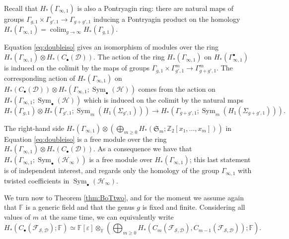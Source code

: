 \documentclass{amsart}
\theoremstyle{plain}
\theoremstyle{definition}
\newcommand{\D}{\mathcal{D}}
\newcommand{\F}{\mathbb{F}}
\newcommand{\cF}{\mathcal{F}}
\renewcommand{\H}{\mathcal{H}}
\renewcommand{\S}{\mathcal{S}}
\newcommand{\Z}{\mathbb{Z}}
\renewcommand{\gg}{\Gamma_{g,1}}
\newcommand{\pa}[1]{\left(#1\right)}
\renewcommand{\epsilon}{\varepsilon}
\DeclareMathOperator{\Sym}{Sym}
\def\colim{\mathop{\mathrm{colim}}\nolimits}
\begin{document}
Recall that $H_*\pa{\Gamma_{\infty,1}}$ is also a Pontryagin ring: there are natural maps of groups
$\Gamma_{g,1}\times\Gamma_{g',1}\to\Gamma_{g+g',1}$ inducing a Pontryagin product on the homology 
$H_*\pa{\Gamma_{\infty,1}}=\colim_{g\to\infty} H_*\pa{\gg}$.

Equation \ref{eq:doubleiso} gives
an isomorphism of modules over the ring
$H_*\pa{\Gamma_{\infty,1}}\otimes H_*(C_{\bullet}(\D))$. The action of the ring $H_*\pa{\Gamma_{\infty,1}}$
on $H_*\pa{\Gamma_{\infty,1}^{\bullet}}$ is induced on the colimit by 
the maps of groups $\gg\times\Gamma_{g',1}^m\to\Gamma_{g+g',1}^m$.
The corresponding action of $H_*\pa{\Gamma_{\infty,1}}$ on $H_*(C_{\bullet}(\D))\otimes H_*\pa{\Gamma_{\infty,1};\Sym_{\bullet}(\H)}$
comes from the action on $ H_*\pa{\Gamma_{\infty,1};\Sym_{\bullet}(\H)}$ which is induced on the colimit by the natural maps
\[
 H_*(\gg)\otimes H_*(\Gamma_{g',1};\Sym_m(H_1(\Sigma_{g',1})))\to H_*(\Gamma_{g+g',1};\Sym_m(H_1(\Sigma_{g+g',1}))).
\]

The right-hand side $H_*\pa{\Gamma_{\infty,1}}\otimes \pa{\bigoplus_{m\geq 0} H_*\pa{\mathfrak{S}_m;\Z_2[x_1,\dots,x_m]}}$
in Equation \ref{eq:doubleiso} is a free module over the ring $H_*\pa{\Gamma_{\infty,1}}\otimes H_*(C_{\bullet}(\D))$.
As a consequence we have that $H_*\pa{\Gamma_{\infty,1};\Sym_{\bullet}(\H_{\infty})}$ is a free module
over $H_*\pa{\Gamma_{\infty,1}}$; this last statement is of independent interest, and regards only the homology
of the group $\Gamma_{\infty,1}$ with twisted coefficients in $\Sym_{\bullet}(\H_{\infty})$.


We turn now to Theorem \ref{thm:BoTtwo}, and for the moment we assume again that $\F$ is a generic field and that the genus $g$
is fixed and finite. Considering
all values of $m$ at the same time, we can equivalently write
\begin{equation}
\label{eq:epsilonsplitting}
 H_*\pa{C_{\bullet}(\cF_{\S,\D});\F}\simeq \F[\epsilon]\otimes_{\F}\pa{\bigoplus_{m\geq 0} H_*\pa{C_m(\cF_{\S,\D}),C_{m-1}(\cF_{\S,\D})};\F}.
 \end{equation}
\end{document}
